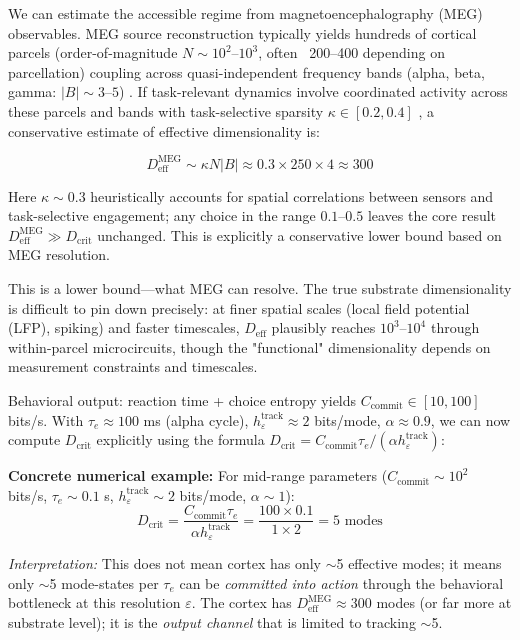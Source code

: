 \documentclass[12pt]{article}
\begin{document}
We can estimate the accessible regime from magnetoencephalography (MEG) observables. MEG source reconstruction typically yields hundreds of cortical parcels (order-of-magnitude $N \sim 10^2$--$10^3$, often ~200--400 depending on parcellation) coupling across quasi-independent frequency bands (alpha, beta, gamma: $|B| \sim 3$--$5$) \cite{siegel2012}. If task-relevant dynamics involve coordinated activity across these parcels and bands with task-selective sparsity $\kappa \in [0.2, 0.4]$ \cite{shine2019}, a conservative estimate of effective dimensionality is:

\begin{equation}
D_{\text{eff}}^{\text{MEG}} \sim \kappa N |B| \approx 0.3 \times 250 \times 4 \approx 300
\end{equation}

Here $\kappa \sim 0.3$ heuristically accounts for spatial correlations between sensors and task-selective engagement; any choice in the range $0.1$--$0.5$ leaves the core result $D_{\text{eff}}^{\text{MEG}} \gg D_{\text{crit}}$ unchanged. This is explicitly a conservative lower bound based on MEG resolution.

This is a lower bound—what MEG can resolve. The true substrate dimensionality is difficult to pin down precisely: at finer spatial scales (local field potential (LFP), spiking) and faster timescales, $D_{\text{eff}}$ plausibly reaches $10^3$--$10^4$ through within-parcel microcircuits, though the "functional" dimensionality depends on measurement constraints and timescales.

Behavioral output: reaction time + choice entropy yields $C_{\text{commit}} \in [10, 100]$ bits/s. With $\tau_e \approx 100$ ms (alpha cycle), $h_\varepsilon^{\text{track}} \approx 2$ bits/mode, $\alpha \approx 0.9$, we can now compute $D_{\text{crit}}$ explicitly using the formula $D_{\text{crit}} = C_{\text{commit}} \tau_e / (\alpha h_\varepsilon^{\text{track}})$:

\textbf{Concrete numerical example:} For mid-range parameters ($C_{\text{commit}} \sim 10^2$ bits/s, $\tau_e \sim 0.1$ s, $h_\varepsilon^{\text{track}} \sim 2$ bits/mode, $\alpha \sim 1$):
\begin{equation}
D_{\text{crit}} = \frac{C_{\text{commit}} \tau_e}{\alpha h_\varepsilon^{\text{track}}} = \frac{100 \times 0.1}{1 \times 2} = 5 \text{ modes}
\end{equation}

\textit{Interpretation:} This does not mean cortex has only $\sim$5 effective modes; it means only $\sim$5 mode-states per $\tau_e$ can be \textit{committed into action} through the behavioral bottleneck at this resolution $\varepsilon$. The cortex has $D_{\text{eff}}^{\text{MEG}} \approx 300$ modes (or far more at substrate level); it is the \textit{output channel} that is limited to tracking $\sim$5.
\end{document}
